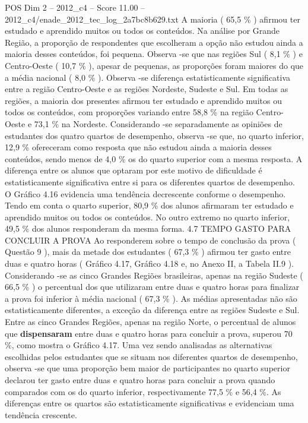 \begin{textsample}{POS Dim 2 – 2012\_c4 – Score 11.00 – 2012\_c4/enade\_2012\_tec\_log\_2a7bc8b629.txt}
A maioria ( 65,5 \% ) afirmou ter estudado e aprendido muitos ou todos os conteúdos.
Na análise por Grande Região, a proporção de respondentes que escolheram a opção não estudou ainda a maioria desses conteúdos, foi pequena.
Observa -se que nas regiões Sul ( 8,1 \% ) e Centro-Oeste ( 10,7 \% ), apesar de pequenas, as proporções foram maiores do que a média nacional ( 8,0 \% ).
Observa -se diferença estatisticamente significativa entre a região Centro-Oeste e as regiões Nordeste, Sudeste e Sul.
Em todas as regiões, a maioria dos presentes afirmou ter estudado e aprendido muitos ou todos os conteúdos, com proporções variando entre 58,8 \% na região Centro-Oeste e 73,1 \% na Nordeste.
Considerando -se separadamente as opiniões de estudantes dos quatro quartos de desempenho, observa -se que, no quarto inferior, 12,9 \% ofereceram como resposta que não estudou ainda a maioria desses conteúdos, sendo menos de 4,0 \% os do quarto superior com a mesma resposta.
A diferença entre os alunos que optaram por este motivo de dificuldade é estatisticamente significativa entre si para os diferentes quartos de desempenho.
O Gráfico 4.16 evidencia uma tendência decrescente conforme o desempenho.
Tendo em conta o quarto superior, 80,9 \% dos alunos afirmaram ter estudado e aprendido muitos ou todos os conteúdos.
No outro extremo no quarto inferior, 49,5 \% dos alunos responderam da mesma forma. 4.7 TEMPO GASTO PARA CONCLUIR A PROVA Ao responderem sobre o tempo de conclusão da prova ( Questão 9 ), mais da metade dos estudantes ( 67,3 \% ) afirmou ter gasto entre duas e quatro horas ( Gráfico 4.17, Gráfico 4.18 e, no Anexo II, a Tabela II.9 ).
Considerando -se as cinco Grandes Regiões brasileiras, apenas na região Sudeste ( 66,5 \% ) o percentual dos que utilizaram entre duas e quatro horas para finalizar a prova foi inferior à média nacional ( 67,3 \% ).
As médias apresentadas não são estatisticamente diferentes, a exceção da diferença entre as regiões Sudeste e Sul.
Entre as cinco Grandes Regiões, apenas na região Norte, o percentual de alunos que \textbf{dispensaram} entre duas e quatro horas para concluir a prova, superou 70 \%, como mostra o Gráfico 4.17.
Uma vez sendo analisadas as alternativas escolhidas pelos estudantes que se situam nos diferentes quartos de desempenho, observa -se que uma proporção bem maior de participantes no quarto superior declarou ter gasto entre duas e quatro horas para concluir a prova quando comparados com os do quarto inferior, respectivamente 77,5 \% e 56,4 \%.
As diferenças entre os quartos são estatisticamente significativas e evidenciam uma tendência crescente.

\end{textsample}
